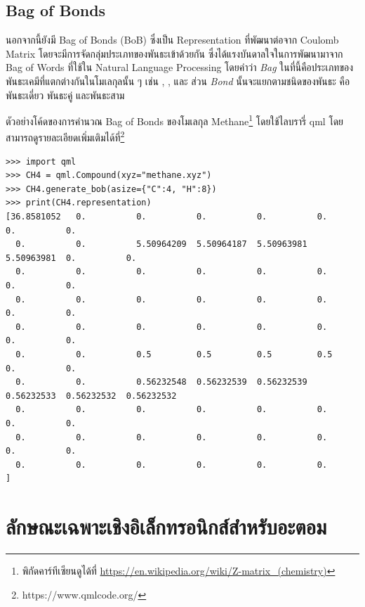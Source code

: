 \subsection{Bag of Bonds}
\label{ssec:bob}

นอกจากนี้ยังมี Bag of Bonds (BoB)\autocite{hansen2015} ซึ่งเป็น Representation ที่พัฒนาต่อจาก Coulomb Matrix 
โดยจะมีการจัดกลุ่มประเภทของพันธะเข้าด้วยกัน ซึ่งได้แรงบันดาลใจในการพัฒนามาจาก Bag of Words ที่ใช้ใน Natural Language Processing
โดยคำว่า \textit{Bag} ในที่นี้คือประเภทของพันธะเคมีที่แตกต่างกันในโมเลกุลนั้น ๆ เช่น , , และ  
ส่วน \textit{Bond} นั้นจะแยกตามชนิดของพันธะ คือพันธะเดี่ยว พันธะคู่ และพันธะสาม

ตัวอย่างโค้ดของการคำนวณ Bag of Bonds ของโมเลกุล Methane\footnote{พิกัดคาร์ทีเซียนดูได้ที่ 
\url{https://en.wikipedia.org/wiki/Z-matrix_(chemistry)}} โดยใช้ไลบรารี่ qml\autocite{zotero-1799} 
โดยสามารถดูรายละเอียดเพิ่มเติมได้ที่\footnote{https://www.qmlcode.org/}

\begin{lstlisting}[style=MyPython]
>>> import qml
>>> CH4 = qml.Compound(xyz="methane.xyz")
>>> CH4.generate_bob(asize={"C":4, "H":8})
>>> print(CH4.representation)
[36.8581052   0.          0.          0.          0.          0.          0.          0.
  0.          0.          5.50964209  5.50964187  5.50963981  5.50963981  0.          0.
  0.          0.          0.          0.          0.          0.          0.          0.
  0.          0.          0.          0.          0.          0.          0.          0.
  0.          0.          0.          0.          0.          0.          0.          0.
  0.          0.          0.5         0.5         0.5         0.5         0.          0.
  0.          0.          0.56232548  0.56232539  0.56232539  0.56232533  0.56232532  0.56232532
  0.          0.          0.          0.          0.          0.          0.          0.
  0.          0.          0.          0.          0.          0.          0.          0.
  0.          0.          0.          0.          0.          0.        ]
\end{lstlisting}

\section{ลักษณะเฉพาะเชิงอิเล็กทรอนิกส์สำหรับอะตอม}
\label{sec:elec_feat}

